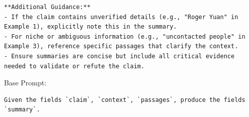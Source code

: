 \begin{instructbox}
\begin{lstlisting}[breakindent=0pt, breaklines=true, breakatwhitespace=true, frame=single, backgroundcolor=\color{blue!10}]
**Additional Guidance:**  
- If the claim contains unverified details (e.g., "Roger Yuan" in Example 1), explicitly note this in the summary.  
- For niche or ambiguous information (e.g., "uncontacted people" in Example 3), reference specific passages that clarify the context.  
- Ensure summaries are concise but include all critical evidence needed to validate or refute the claim.
\end{lstlisting}
\end{instructbox}\begin{instructbox}
Base Prompt:
\begin{lstlisting}[breakindent=0pt, breaklines=true, breakatwhitespace=true, frame=single, backgroundcolor=\color{gray!10}]
Given the fields `claim`, `context`, `passages`, produce the fields `summary`.
\end{lstlisting}


\end{instructbox}
